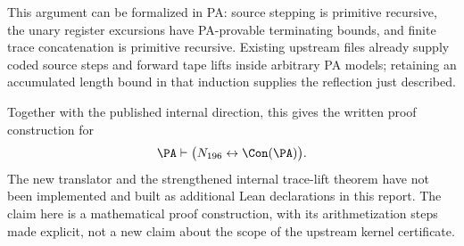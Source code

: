This argument can be formalized in PA: source stepping is primitive recursive, the unary register excursions have PA-provable terminating bounds, and finite trace concatenation is primitive recursive. Existing upstream files already supply coded source steps and forward tape lifts inside arbitrary PA models; retaining an accumulated length bound in that induction supplies the reflection just described.

Together with the published internal direction, this gives the written proof construction for
\[
 \PA\vdash\bigl(N_{196}\leftrightarrow\Con(\PA)\bigr).
\]
The new translator and the strengthened internal trace-lift theorem have not been implemented and built as additional Lean declarations in this report. The claim here is a mathematical proof construction, with its arithmetization steps made explicit, not a new claim about the scope of the upstream kernel certificate.
